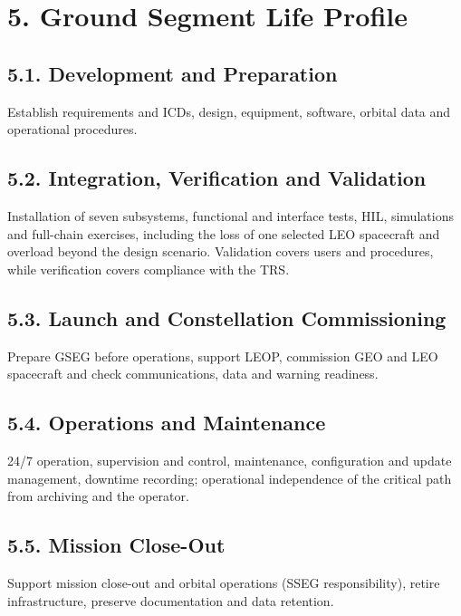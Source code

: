 \section{5. Ground Segment Life Profile}\label{ground-segment-life-profile}

\subsection{5.1. Development and Preparation}\label{development-and-preparation}

Establish requirements and ICDs, design, equipment, software, orbital data and operational procedures.

\subsection{5.2. Integration, Verification and Validation}\label{integration-verification-and-operational-validation}

Installation of seven subsystems, functional and interface tests, HIL, simulations and full-chain exercises, including the loss of one selected LEO spacecraft and overload beyond the design scenario. Validation covers users and procedures, while verification covers compliance with the TRS.

\subsection{5.3. Launch and Constellation Commissioning}\label{launch-support-and-constellation-commissioning}

Prepare GSEG before operations, support LEOP, commission GEO and LEO spacecraft and check communications, data and warning readiness.

\subsection{5.4. Operations and Maintenance}\label{operation-and-maintenance}

24/\allowbreak{}7 operation, supervision and control, maintenance, configuration and update management, downtime recording; operational independence of the critical path from archiving and the operator.

\subsection{5.5. Mission Close-Out}\label{end-of-mission-and-gseg-decommissioning}

Support mission close-out and orbital operations (SSEG responsibility), retire infrastructure, preserve documentation and data retention.

